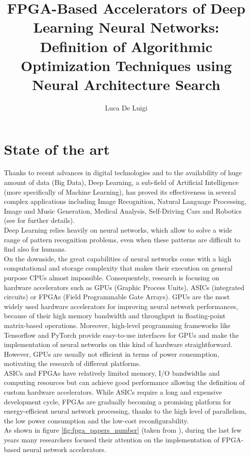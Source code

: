 \documentclass[11pt,a4paper]{article}
\author{Luca De Luigi}
\title{FPGA-Based Accelerators of Deep Learning Neural Networks: Definition of Algorithmic Optimization Techniques using Neural Architecture Search}
\begin{document}
\maketitle

\tableofcontents

\section{State of the art}
Thanks to recent advances in digital technologies and to the availability of huge amount of data (Big Data), Deep Learning, a sub-field of Artificial Intelligence (more specifically of Machine Learning), has proved its effectiveness in several complex applications including Image Recognition, Natural Language Processing, Image and Music Generation, Medical Analysis, Self-Driving Cars and Robotics (see \cite{deep_learning_book} for further details).\\
Deep Learning relies heavily on neural networks, which allow to solve a wide range of pattern recognition problems, even when these patterns are difficult to find also for humans.\\
On the downside, the great capabilities of neural networks come with a high computational and storage complexity that makes their execution on general purpose CPUs almost impossible. Consequentely, research is focusing on hardware accelerators such as GPUs (Graphic Process Units), ASICs (integrated circuits) or FPGAs (Field Programmable Gate Arrays). GPUs are the most widely used hardware accelerators for improving neural network performances, because of their high memory bandwidth and throughput in floating-point matrix-based operations. Moreover, high-level programming frameworks like Tensorflow and PyTorch provide easy-to-use interfaces for GPUs and make the implementation of neural networks on this kind of hardware straightforward. However, GPUs are usually not efficient in terms of power consumption, motivating the research of different platforms.\\
ASICs and FPGAs have relatively limited memory, I/O bandwidths and computing resources but can achieve good performance allowing the definition of custom hardware accelerators. While ASICs require a long and expensive development cycle, FPGAs are gradually becoming a promising platform for energy-efficient neural network processing, thanks to the high level of parallelism, the low power consumption and the low-cost reconfigurability.\\
As shown in figure \ref{fig:fpga_papers_number} (taken from \cite{wang_survey_2018}), during the last few years many researchers focused their attention on the implementation of FPGA-based neural network accelerators.
\end{document}
